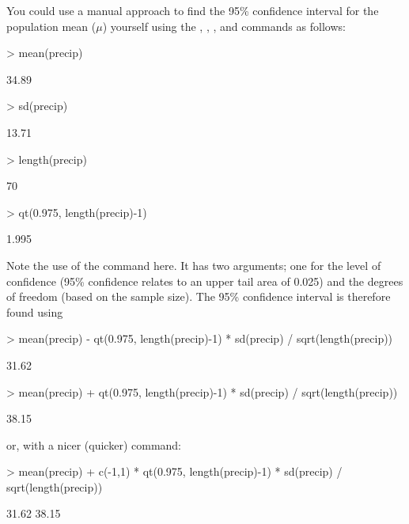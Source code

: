 You could use a manual approach to find the 95\% confidence interval for the population mean ($\mu$) yourself using the , , , and  commands as follows: 
\begin{Schunk}
\begin{Sinput}
> mean(precip)
\end{Sinput}
\begin{Soutput}
[1] 34.89
\end{Soutput}
\begin{Sinput}
> sd(precip)
\end{Sinput}
\begin{Soutput}
[1] 13.71
\end{Soutput}
\begin{Sinput}
> length(precip)
\end{Sinput}
\begin{Soutput}
[1] 70
\end{Soutput}
\begin{Sinput}
> qt(0.975, length(precip)-1)
\end{Sinput}
\begin{Soutput}
[1] 1.995
\end{Soutput}
\end{Schunk}
Note the use of the  command here. It has two arguments; one for the level of confidence (95\% confidence relates to an upper tail area of 0.025) and the degrees of freedom (based on the sample size). The 95\% confidence interval is therefore found using
\begin{Schunk}
\begin{Sinput}
> mean(precip) - qt(0.975, length(precip)-1) * sd(precip) / sqrt(length(precip))
\end{Sinput}
\begin{Soutput}
[1] 31.62
\end{Soutput}
\begin{Sinput}
> mean(precip) + qt(0.975, length(precip)-1) * sd(precip) / sqrt(length(precip))
\end{Sinput}
\begin{Soutput}
[1] 38.15
\end{Soutput}
\end{Schunk}
or, with a nicer (quicker) command:
\begin{Schunk}
\begin{Sinput}
> mean(precip) + c(-1,1) * qt(0.975, length(precip)-1) * sd(precip) / sqrt(length(precip))
\end{Sinput}
\begin{Soutput}
[1] 31.62 38.15
\end{Soutput}
\end{Schunk}
